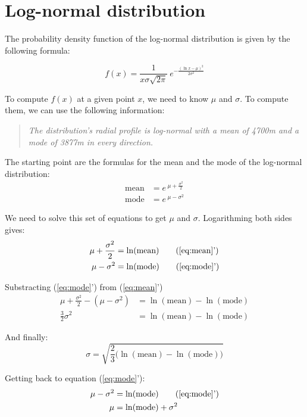 \documentclass[a4paper,12pt]{article}
\begin{document}
\section{Log-normal distribution}

The probability density function of the log-normal distribution is given by the following formula:

\begin{equation*}
f(x) = \frac{1}{x\sigma{\sqrt{2\pi}}}\: e^{-{\frac {\left(\ln x-\mu \right)^{2}}{2\sigma ^{2}}}}
\end{equation*}

To compute \(f(x)\) at a given point \(x\), we need to know \(\mu\) and \(\sigma\). To compute them, we can use the following information:

\begin{quotation}
\emph{The distribution's radial profile is log-normal with a mean of 4700m and a mode of 3877m in every direction.}
\end{quotation}

The starting point are the formulas for the mean and the mode of the log-normal distribution:
\begin{align}
  \mbox{mean} &= e\, ^{\mu + \frac{\sigma^2}{2}} \label{eq:mean}\\
  \mbox{mode} &= e\, ^{\mu - \sigma^2} \label{eq:mode}
\end{align}

We need to solve this set of equations to get \(\mu\) and \(\sigma\). Logarithming both sides gives:
\begin{align*}
  \mu + \frac{\sigma^2}{2} &= \ln(\mbox{mean}) \tag{\ref{eq:mean}'}\\
  \mu - \sigma^2 &= \ln(\mbox{mode}) \tag{\ref{eq:mode}'}
\end{align*}

Substracting (\ref{eq:mode}') from (\ref{eq:mean}')
\begin{align*}
  \mu + \frac{\sigma^2}{2} - (\mu - \sigma^2) &= \ln(\mbox{mean}) - \ln(\mbox{mode})\\
  \frac{3}{2}\sigma^2 &= \ln(\mbox{mean}) - \ln(\mbox{mode})
\end{align*}

And finally:
\[\sigma = \sqrt{\frac{2}{3}\bigl(\ln(\mbox{mean}) - \ln(\mbox{mode})\bigr)}\tag{\(\sigma\)}\]

Getting back to equation (\ref{eq:mode}'):
\begin{align*}
  \mu - \sigma^2 &= \ln(\mbox{mode}) \tag{\ref{eq:mode}'}\\
  \mu &= \ln(\mbox{mode}) + \sigma^2
\end{align*}
\end{document}
